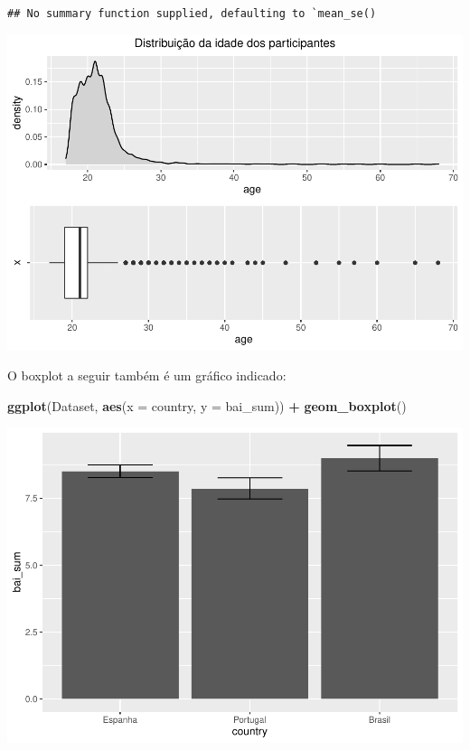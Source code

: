 \documentclass[
]{book}
\newenvironment{Shaded}{\begin{snugshade}}{\end{snugshade}}
\newcommand{\DataTypeTok}[1]{\textcolor[rgb]{0.13,0.29,0.53}{#1}}
\newcommand{\KeywordTok}[1]{\textcolor[rgb]{0.13,0.29,0.53}{\textbf{#1}}}
\newcommand{\NormalTok}[1]{#1}
\newcommand{\OperatorTok}[1]{\textcolor[rgb]{0.81,0.36,0.00}{\textbf{#1}}}
\newcommand{\StringTok}[1]{\textcolor[rgb]{0.31,0.60,0.02}{#1}}
\begin{document}
\begin{verbatim}
## No summary function supplied, defaulting to `mean_se()
\end{verbatim}

\includegraphics{gitbook-demo_files/figure-latex/unnamed-chunk-19-1.pdf}

O boxplot a seguir também é um gráfico indicado:

\begin{Shaded}
\begin{Highlighting}[]
\KeywordTok{ggplot}\NormalTok{(Dataset, }\KeywordTok{aes}\NormalTok{(}\DataTypeTok{x =}\NormalTok{ country, }\DataTypeTok{y =}\NormalTok{ bai_sum)) }\OperatorTok{+}
\StringTok{  }\KeywordTok{geom_boxplot}\NormalTok{()}
\end{Highlighting}
\end{Shaded}

\includegraphics{gitbook-demo_files/figure-latex/unnamed-chunk-20-1.pdf}
\end{document}
